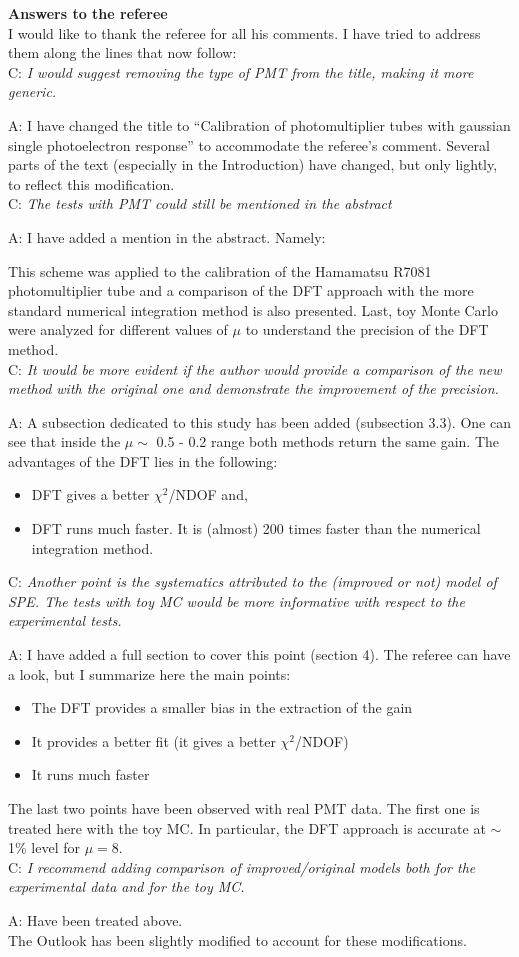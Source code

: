 \documentclass[a4paper,11pt]{article}
\begin{document}
{\bf Answers to the referee}
\\[1ex]

I would like to thank the referee for all his comments. 
I have tried to address them along the lines that now follow:
\\[1ex]

C: \emph{ I would suggest removing the type of PMT from the title, making it more generic. } 
	
A: I have changed the title to ``Calibration of photomultiplier tubes with gaussian single photoelectron response'' 
to accommodate the referee's comment.
Several parts of the text (especially in the Introduction) have changed, but only lightly, to reflect this modification. 
\\[1ex]

C: \emph{The tests with PMT could still be mentioned in the abstract} 

A: I have added a mention in the abstract. Namely: 

This scheme was applied to the calibration of the Hamamatsu R7081 photomultiplier tube and a comparison of the DFT approach with the more standard numerical integration method is also presented.
Last, toy Monte Carlo were analyzed for different values of $\mu$ to understand the precision of the DFT method.
\\[1ex]

C: \emph{ It would be more evident if the author would provide a comparison of the new method with the original one and demonstrate the improvement of the precision. }
	
A: A subsection dedicated to this study has been added (subsection 3.3). 
One can see that inside the $\mu\sim$ 0.5 - 0.2 range both methods return the same gain. 
The advantages of the DFT lies in the following:
\begin{itemize}
\item DFT gives a better $\chi^2$/NDOF and, 
\item DFT runs much faster. 
It is (almost) 200 times faster than the numerical integration method. 
\end{itemize}


C: \emph{Another point is the systematics attributed to the (improved or not) model of SPE. 
The tests with toy MC would be more informative with respect to the experimental tests.}

A: I have added a full section to cover this point (section 4). The referee can have a look, but I summarize here the main points: 
\begin{itemize}
\item The DFT provides a smaller bias in the extraction of the gain
\item It provides a better fit (it gives a better $\chi^2$/NDOF)
\item It runs much faster 
\end{itemize}
The last two points have been observed with real PMT data. 
The first one is treated here with the toy MC. 
In particular, the DFT approach is accurate at $\sim$ 1\% level for $\mu=8$. 
\\[1ex]

C: \emph{I recommend adding comparison of improved/original models both for the experimental data and for the toy MC.}

A: Have been treated above.
\\[1ex]

The Outlook has been slightly modified to account for these modifications. 
\end{document}
